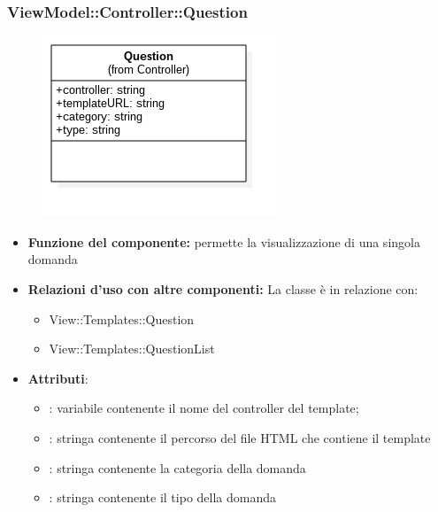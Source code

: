 \newpage

\subsubsection{ViewModel::Controller::Question}
\begin{figure}[h!]
\begin{center}
	\includegraphics[scale=0.4]{../images/ViewModel/Controller/Question.png}
\end{center}
\end{figure}
\begin{itemize}
\item\textbf{Funzione del componente:} permette la visualizzazione di una singola domanda
				\item\textbf{Relazioni d'uso con altre componenti:} 
La classe è in relazione con:
\begin{itemize}
		\item View::Templates::Question
		\item View::Templates::QuestionList
	\end{itemize}
\item\textbf{Attributi}:
	\begin{itemize}
		\item{}: variabile contenente il nome del controller del template;\\

		\item{}: stringa contenente il percorso del file HTML che contiene il template\\
		\item{}: stringa contenente la categoria della domanda
 		\item{}: stringa contenente il tipo della domanda
	\end{itemize}
\end{itemize}
\newpage

